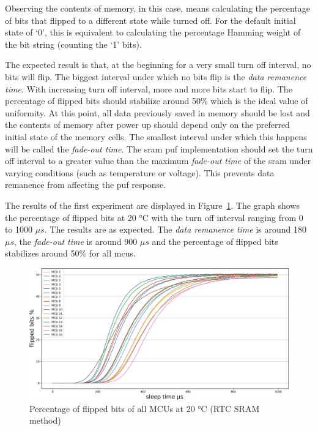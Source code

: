 Observing the contents of memory, in this case, means calculating the percentage of bits that flipped to a different state while turned off. For the default initial state of `0', this is equivalent to calculating the percentage Hamming weight of the bit string (counting the `1' bits).

The expected result is that, at the beginning for a very small turn off interval, no bits will flip. The biggest interval under which no bits flip is the \emph{data remanence time}. With increasing turn off interval, more and more bits start to flip. The percentage of flipped bits should stabilize around 50\% which is the ideal value of uniformity. At this point, all data previously saved in memory should be lost and the contents of memory after power up should depend only on the preferred initial state of the memory cells. The smallest interval under which this happens will be called the \emph{fade-out time}. The \gls{sram} \gls{puf} implementation should set the turn off interval to a greater value than the maximum \emph{fade-out time} of the \gls{sram} under varying conditions (such as temperature or voltage). This prevents data remanence from affecting the \gls{puf} response.

The results of the first experiment are displayed in Figure~\ref{fig:all_plus_20_rtc}. The graph shows the percentage of flipped bits at 20 °C with the turn off interval ranging from 0 to 1000 $\mu{}s$. The results are as expected. The \emph{data remanence time} is around 180 $\mu{}s$, the \emph{fade-out time} is around 900 $\mu{}s$ and the percentage of flipped bits stabilizes around 50\% for all \glspl{mcu}.

\begin{figure}[ht!]
    \centering
    \captionsetup{justification=centering,margin=0.5cm}
    \includegraphics[width=\textwidth]{images/all_plus_20_rtc.png}
    \caption{Percentage of flipped bits of all MCUs at 20 °C (RTC SRAM method)}
    \label{fig:all_plus_20_rtc}
\end{figure}


